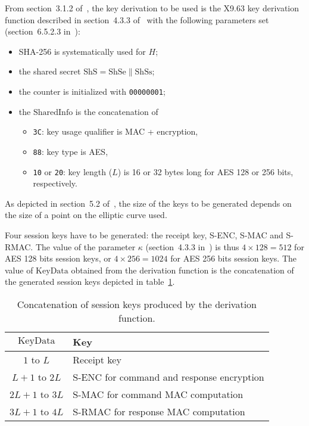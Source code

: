 \documentclass[dvipdfmx,11pt,a4paper,english,final]{article}
\newcommand{\shse}[0]{\ensuremath{\mathrm{ShSe}}\xspace}
\newcommand{\shss}[0]{\ensuremath{\mathrm{ShSs}}\xspace}
\newcommand{\code}[1]{\texttt{#1}\xspace}
\begin{document}
From section~3.1.2 of~\cite{gp-scp11}, the key derivation to be used
is the X9.63 key derivation function described in section~4.3.3
of~\cite{bsi-ecc} with the following parameters set (section~6.5.2.3
in~\cite{gp-scp11}):
\begin{itemize}
\item SHA-256 is systematically used for $H$;
\item the shared secret $\mathrm{ShS} = \shse \parallel \shss$;
\item the counter is initialized with \code{00000001};
\item the $\mathrm{SharedInfo}$ is the concatenation of
  \begin{itemize}
  \item \code{3C}: key usage qualifier is MAC + encryption,
  \item \code{88}: key type is AES,
  \item \code{10} or \code{20}: key length ($L$) is 16 or 32 bytes
    long for AES 128 or 256 bits, respectively.
  \end{itemize}
\end{itemize}

As depicted in section~5.2 of~\cite{gp-scp11}, the size of the keys to
be generated depends on the size of a point on the elliptic curve
used.

Four session keys have to be generated: the receipt key, S-ENC, S-MAC
and S-RMAC. The value of the parameter $\kappa$ (section~4.3.3
in~\cite{bsi-ecc}) is thus $4 \times 128 = 512$ for AES 128 bits
session keys, or $4 \times 256 = 1024$ for AES 256 bits session
keys. The value of $\mathrm{KeyData}$ obtained from the derivation
function is the concatenation of the generated session keys depicted
in table~\ref{tab:auth:sessionkeys}.

\begin{table}[ht]
  \centering
  \begin{tabular}{|c|l|}
    \hline
    \textbf{$\mathrm{KeyData}$}&\textbf{Key}\\
    \hline
    $1$ to $L$&Receipt key\\
    \hline
    $L + 1$ to $2L$&S-ENC for command and response encryption\\
    \hline
    $2L + 1$ to $3L$&S-MAC for command MAC computation\\
    \hline
    $3L + 1$ to $4L$&S-RMAC for response MAC computation\\
    \hline
  \end{tabular}
  \caption{Concatenation of session keys produced by the derivation function.}
  \label{tab:auth:sessionkeys}
\end{table}
\end{document}
